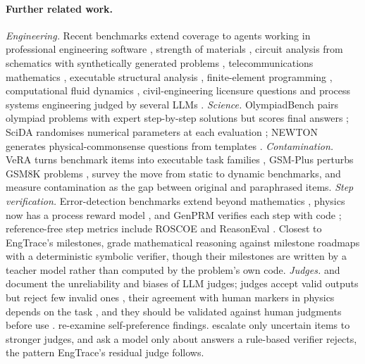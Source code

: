 \paragraph{Further related work.}
\textit{Engineering.} Recent benchmarks extend coverage to agents working in professional engineering software \citep{gao2026engiworld}, strength of materials \citep{wan2025som1k}, circuit analysis from schematics with synthetically generated problems \citep{akbari2025circuitsense}, telecommunications mathematics \citep{colle2025telemath}, executable structural analysis \citep{qin2026structureclaw}, finite-element programming \citep{mohammadzadeh2025fembench}, computational fluid dynamics \citep{somasekharan2026cfdllmbench}, civil-engineering licensure questions \citep{silwal2026pecivilbench} and process systems engineering judged by several LLMs \citep{sukpancharoen2026psebench}.
\textit{Science.} OlympiadBench pairs olympiad problems with expert step-by-step solutions but scores final answers \citep{he2024olympiadbench}; SciDA randomises numerical parameters at each evaluation \citep{zhou2025scida}; NEWTON generates physical-commonsense questions from templates \citep{wang2023newton}.
\textit{Contamination.} VeRA turns benchmark items into executable task families \citep{cheng2026vera}, GSM-Plus perturbs GSM8K problems \citep{li2024gsmplus}, \citet{chen2025staticdynamicsurvey} survey the move from static to dynamic benchmarks, and \citet{xiao2026contaminationrankings} measure contamination as the gap between original and paraphrased items.
\textit{Step verification.} Error-detection benchmarks extend beyond mathematics \citep{tyen2023bigbenchmistake,zeng2024mrben,he2025deltabench,sun2026lsrben}, physics now has a process reward model \citep{dong2026physprm}, and GenPRM verifies each step with code \citep{zhao2025genprm}; reference-free step metrics include ROSCOE \citep{golovneva2022roscoe} and ReasonEval \citep{xia2024reasoneval}.
Closest to EngTrace's milestones, \citet{wang2026milestoneoracles} grade mathematical reasoning against milestone roadmaps with a deterministic symbolic verifier, though their milestones are written by a teacher model rather than computed by the problem's own code.
\textit{Judges.} \citet{thakur2025judgingjudges} and \citet{ye2025justiceprejudice} document the unreliability and biases of LLM judges; judges accept valid outputs but reject few invalid ones \citep{jain2025agreeableness}, their agreement with human markers in physics depends on the task \citep{yeadon2026physicsjudge}, and they should be validated against human judgments before use \citep{bavaresco2025llmsinsteadofhumans}.
\citet{roytburg2026narcissists} re-examine self-preference findings. \citet{jung2025trustescalate} escalate only uncertain items to stronger judges, and \citet{huang2026verifierrobustness} ask a model only about answers a rule-based verifier rejects, the pattern EngTrace's residual judge follows.
